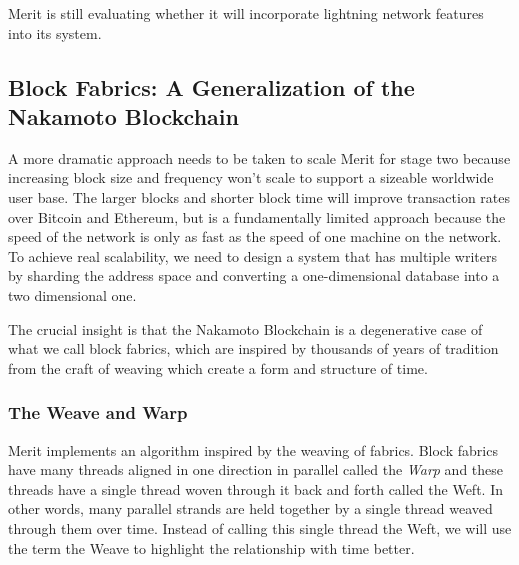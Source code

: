 \documentclass{article}
\begin{document}
Merit is still evaluating whether it will incorporate lightning network features
into its system.

\subsection{Block Fabrics: A Generalization of the Nakamoto Blockchain}

A more dramatic approach needs to be taken to scale Merit for stage two because
increasing block size and frequency won't scale to support a sizeable worldwide user base.
The larger blocks and shorter block time will improve transaction rates over Bitcoin
and Ethereum, but is a fundamentally limited approach because the speed of the network
is only as fast as the speed of one machine on the network.  To achieve real scalability,
we need to design a system that has multiple writers by \gls{sharding} the address space
and converting a one-dimensional database into a two dimensional one.

The crucial insight is that the Nakamoto Blockchain is a degenerative case of what
we call \glspl{block fabric}, which are inspired by thousands of years of tradition from the
craft of weaving which create a form and structure of time.

\subsubsection{The Weave and Warp}

Merit implements an algorithm inspired by the weaving of fabrics.  Block fabrics
have many threads aligned in one direction in parallel called the \emph{Warp}
and these threads have a single thread woven through it back and forth called
the Weft.  In other words, many parallel strands are held together
by a single thread weaved through them over time.  Instead of calling this single 
thread the Weft, we will use the term the Weave to highlight the relationship
with time better.
\end{document}

